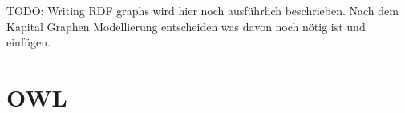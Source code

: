 TODO: Writing RDF graphs wird hier noch ausführlich beschrieben. Nach dem Kapital Graphen Modellierung entscheiden was davon noch nötig ist und einfügen.

\section{OWL}
\label{sec:owlRdf_owl}




